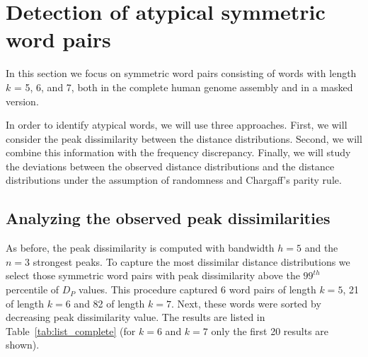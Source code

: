 \documentclass[review,12pt]{elsarticle}
\begin{document}
\section{Detection of atypical symmetric
         word pairs}
In this section we focus on symmetric word
pairs consisting of words with length
$k$ = 5, 6, and 7, both in
the complete human genome
assembly and in a masked version.

In order to identify atypical words, we will
use three approaches.
First, we will consider the peak dissimilarity
between the distance distributions.
Second, we will combine this information with
the frequency discrepancy.
Finally, we will study the deviations between
the observed distance distributions and the distance
distributions under the assumption of randomness
and Chargaff's parity rule.


\subsection{Analyzing the observed peak
            dissimilarities}
As before, the peak dissimilarity is computed
with bandwidth $h=5$ and the $n=3$ strongest
peaks.
To capture the most dissimilar distance
distributions we select those symmetric word
pairs with peak dissimilarity above the
$99^{th}$ percentile of $D_P$ values.
This procedure captured 6 word pairs of length
$k=5$, 21 of length $k=6$ and 82 of length $k=7$.
Next, these words were sorted by decreasing
peak dissimilarity value. The results are listed
in Table~\ref{tab:list_complete} (for $k = 6$ and $k = 7$
only the first 20 results are shown).
\end{document}
